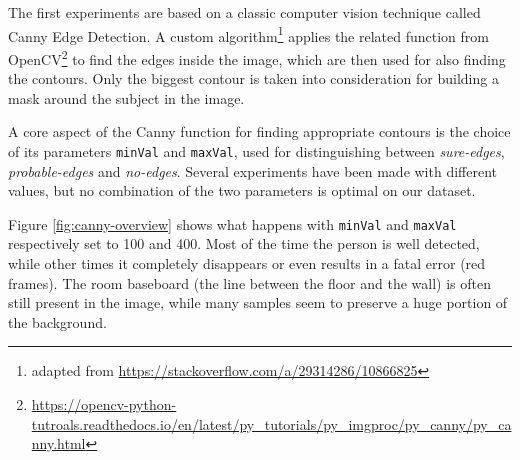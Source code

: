 The first experiments are based on a classic computer vision technique called Canny Edge Detection. A custom algorithm\footnote{adapted from \url{https://stackoverflow.com/a/29314286/10866825}} applies the related function from OpenCV\footnote{\url{https://opencv-python-tutroals.readthedocs.io/en/latest/py_tutorials/py_imgproc/py_canny/py_canny.html}} to find the edges inside the image, which are then used for also finding the contours. Only the biggest contour is taken into consideration for building a mask around the subject in the image.

\medskip

A core aspect of the Canny function for finding appropriate contours is the choice of its parameters \texttt{minVal} and \texttt{maxVal}, used for distinguishing between \textit{sure-edges}, \textit{probable-edges} and \textit{no-edges}. Several experiments have been made with different values, but no combination of the two parameters is optimal on our dataset.

Figure \ref{fig:canny-overview} shows what happens with \texttt{minVal} and \texttt{maxVal} respectively set to 100 and 400. Most of the time the person is well detected, while other times it completely disappears or even results in a fatal error (red frames). The room baseboard (the line between the floor and the wall) is often still present in the image, while many samples seem to preserve a huge portion of the background.

\medskip

